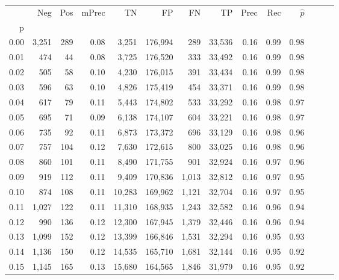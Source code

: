 \begin{tabular}{rrrrrrrrrrrrrr}
\toprule
{} &    Neg &  Pos & mPrec &       TN &       FP &      FN &      TP &  Prec &   Rec & $\hat{p}$ \\
p    &        &      &       &          &          &         &         &       &       &           \\
\midrule
0.00 &  3,251 &  289 &  0.08 &    3,251 &  176,994 &     289 &  33,536 &  0.16 &  0.99 &      0.98 \\
0.01 &    474 &   44 &  0.08 &    3,725 &  176,520 &     333 &  33,492 &  0.16 &  0.99 &      0.98 \\
0.02 &    505 &   58 &  0.10 &    4,230 &  176,015 &     391 &  33,434 &  0.16 &  0.99 &      0.98 \\
0.03 &    596 &   63 &  0.10 &    4,826 &  175,419 &     454 &  33,371 &  0.16 &  0.99 &      0.98 \\
0.04 &    617 &   79 &  0.11 &    5,443 &  174,802 &     533 &  33,292 &  0.16 &  0.98 &      0.97 \\
0.05 &    695 &   71 &  0.09 &    6,138 &  174,107 &     604 &  33,221 &  0.16 &  0.98 &      0.97 \\
0.06 &    735 &   92 &  0.11 &    6,873 &  173,372 &     696 &  33,129 &  0.16 &  0.98 &      0.96 \\
0.07 &    757 &  104 &  0.12 &    7,630 &  172,615 &     800 &  33,025 &  0.16 &  0.98 &      0.96 \\
0.08 &    860 &  101 &  0.11 &    8,490 &  171,755 &     901 &  32,924 &  0.16 &  0.97 &      0.96 \\
0.09 &    919 &  112 &  0.11 &    9,409 &  170,836 &   1,013 &  32,812 &  0.16 &  0.97 &      0.95 \\
0.10 &    874 &  108 &  0.11 &   10,283 &  169,962 &   1,121 &  32,704 &  0.16 &  0.97 &      0.95 \\
0.11 &  1,027 &  122 &  0.11 &   11,310 &  168,935 &   1,243 &  32,582 &  0.16 &  0.96 &      0.94 \\
0.12 &    990 &  136 &  0.12 &   12,300 &  167,945 &   1,379 &  32,446 &  0.16 &  0.96 &      0.94 \\
0.13 &  1,099 &  152 &  0.12 &   13,399 &  166,846 &   1,531 &  32,294 &  0.16 &  0.95 &      0.93 \\
0.14 &  1,136 &  150 &  0.12 &   14,535 &  165,710 &   1,681 &  32,144 &  0.16 &  0.95 &      0.92 \\
0.15 &  1,145 &  165 &  0.13 &   15,680 &  164,565 &   1,846 &  31,979 &  0.16 &  0.95 &      0.92 \\

\end{tabular}
